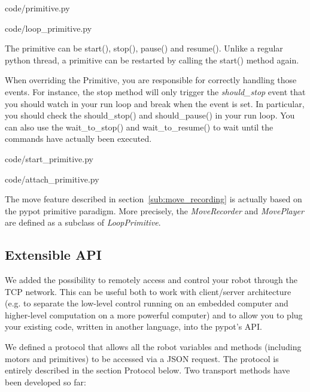 
    {code/primitive.py}


    {code/loop_primitive.py}

The primitive can be start(), stop(), pause() and resume(). Unlike a regular python thread, a primitive can be restarted by calling the start() method again.

When overriding the Primitive, you are responsible for correctly handling those events. For instance, the stop method will only trigger the \emph{should\_stop} event that you should watch in your run loop and break when the event is set. In particular, you should check the should\_stop() and should\_pause() in your run loop. You can also use the wait\_to\_stop() and wait\_to\_resume() to wait until the commands have actually been executed.



    {code/start_primitive.py}


    {code/attach_primitive.py}

The move feature described in section~\ref{sub:move_recording} is actually based on the pypot primitive paradigm. More precisely, the \emph{MoveRecorder} and \emph{MovePlayer} are defined as a subclass of \emph{LoopPrimitive}.

\subsection{Extensible API} %

We added the possibility to remotely access and control your robot through the TCP network. This can be useful both to work with client/server architecture (e.g. to separate the low-level control running on an embedded computer and higher-level computation on a more powerful computer) and to allow you to plug your existing code, written in another language, into the pypot’s API.

We defined a protocol that allows all the robot variables and methods (including motors and primitives) to be accessed via a JSON request. The protocol is entirely described in the section Protocol below. Two transport methods have been developed so far:

